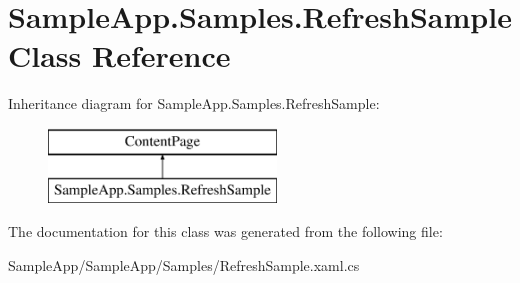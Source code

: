 \hypertarget{class_sample_app_1_1_samples_1_1_refresh_sample}{}\section{Sample\+App.\+Samples.\+Refresh\+Sample Class Reference}
\label{class_sample_app_1_1_samples_1_1_refresh_sample}
Inheritance diagram for Sample\+App.\+Samples.\+Refresh\+Sample\+:\begin{figure}[H]
\begin{center}
\leavevmode
\includegraphics[height=2.000000cm]{class_sample_app_1_1_samples_1_1_refresh_sample}
\end{center}
\end{figure}


The documentation for this class was generated from the following file\+:\begin{DoxyCompactItemize}
\item 
Sample\+App/\+Sample\+App/\+Samples/Refresh\+Sample.\+xaml.\+cs\end{DoxyCompactItemize}

